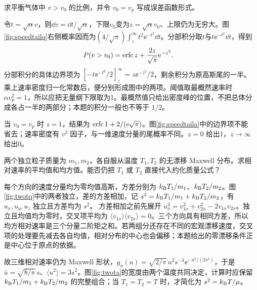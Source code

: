 \begin{exercise}[阈值以上的速率]
求平衡气体中 $v>v_0$ 的比例，并令 $v_0=v_p$ 写成误差函数形式。
\end{exercise}
\begin{solution}
令$t=\sqrt\alpha v$，则$\dd v=\dd t/\sqrt\alpha$，下限$v_0$变为$z=\sqrt\alpha v_0$、上限仍为无穷大。图\ref{fig:speedtailq}右侧概率因而为$(4/\sqrt\pi)\int_z^\infty t^2\ee^{-t^2}\dd t$。分部积分取$t$与$t\ee^{-t^2}\dd t$，得到
\[
 P(v>v_0)=\operatorname{erfc} z+\frac{2z}{\sqrt\pi}\mathrm e^{-z^2}.
\]
分部积分的具体边界项为 $[-t\ee^{-t^2}/2]_z^\infty=z\ee^{-z^2}/2$，剩余积分为原高斯尾的一半。乘上速率密度归一化常数后，便分别形成图中的两项。阈值取最概然速率时 $\alpha v_p^2=1$，所以应把无量纲下限取为1。最概然值只给出密度峰的位置，不把总体分成各占一半的两部分；本题的积分一般也不等于 $1/2$。

当 $v_0=v_p$ 时 $z=1$，结果为 $\operatorname{erfc}1+2/(\mathrm e\sqrt\pi)$。图\ref{fig:speedtaila}中的边界项不能省去；速率密度有 $v^2$ 因子，与一维速度分量的尾概率不同。$z=0$ 给出1，$z\to\infty$ 给出0。
\end{solution}

\begin{exercise}[不同温度的相对速度]
两个独立粒子质量为 $m_1,m_2$，各自服从温度 $T_1,T_2$ 的无漂移 Maxwell 分布。求相对速率的平均值和均方值。能否仍把 $T_1$ 或 $T_2$ 直接代入约化质量公式？
\end{exercise}
\begin{solution}
每个方向的速度分量均为零均值高斯，方差分别为 $k_{\mathrm B} T_1/m_1$、$k_{\mathrm B} T_2/m_2$。图\ref{fig:twotq}中的两者独立，差的方差相加，记 $s^2=k_{\mathrm B} T_1/m_1+k_{\mathrm B} T_2/m_2$，有 $u_x,u_y,u_z$ 独立且方差均为 $s^2$。
方差相加之前先展开 $u_x^2=v_{1x}^2+v_{2x}^2-2v_{1x}v_{2x}$。独立且均值均为零时，交叉项平均为 $\langle v_{1x}\rangle\langle v_{2x}\rangle=0$。三个方向具有相同方差，所以均方相对速率是三个分量二阶矩之和。若两组分还存在不同的宏观漂移速度，交叉项的处理要先减去各自均值，相对分布的中心也会偏移；本题给出的零漂移条件正是中心位于原点的依据。

故三维相对速率仍为 Maxwell 形状，$g_u(u)=\sqrt{2/\pi}\,u^2s^{-3}\ee^{-u^2/(2s^2)}$，于是 $\bar u=\sqrt{8/\pi}\,s$、$\langle u^2\rangle=3s^2$。图\ref{fig:twota}的宽度由两个温度共同决定，计算时应保留 $k_{\mathrm B} T_1/m_1+k_{\mathrm B} T_2/m_2$ 的完整组合；当 $T_1=T_2=T$ 时，才简化为 $s^2=k_{\mathrm B} T/\mu$。
\end{solution}

